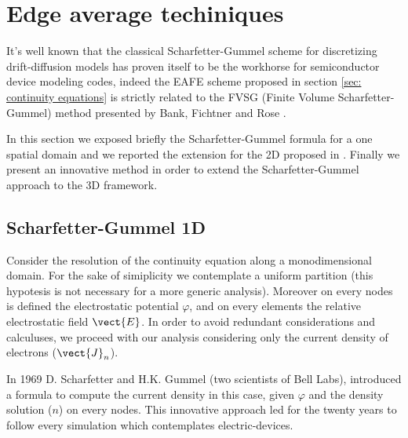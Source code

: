 %
%
%
%

 
 
 \clearpage
 
 
 
 
 
\section{Edge average techiniques} 
 
 It's well known that the classical Scharfetter-Gummel scheme for discretizing drift-diffusion models has proven  itself to be the workhorse for semiconductor device modeling codes, indeed the EAFE scheme proposed in section \ref{sec: continuity equations} is strictly related to the FVSG (Finite Volume Scharfetter-Gummel) method presented by Bank, Fichtner and Rose \cite{Bank:FVSG}. 

In this section we exposed briefly the Scharfetter-Gummel formula for  a one spatial domain and we reported the extension for the 2D proposed in \cite{Bank:FEvsBOX}. Finally we present an innovative method in order to extend the Scharfetter-Gummel approach to the 3D framework.

\subsection{Scharfetter-Gummel 1D}

Consider the resolution of the continuity equation along a monodimensional domain. For the sake of simiplicity we contemplate a uniform partition (this hypotesis is not necessary for a more generic analysis). Moreover on every nodes is defined the electrostatic potential $\varphi$, and on every elements the relative electrostatic field $\vect{E}$. In order to avoid redundant considerations and calculuses, we proceed with our analysis considering only the current density of electrons ($\vect{J}_n$).

 In 1969 D. Scharfetter and H.K. Gummel (two scientists of Bell Labs), introduced a formula to compute the current density in this case, given $\varphi$ and the density solution ($n$) on every nodes. This innovative approach led for the twenty years to follow every simulation which contemplates electric-devices. 
 
